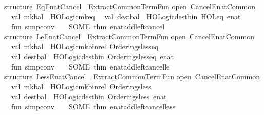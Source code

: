\begin{isabellebody}
\isanewline
structure\ Eq{\isacharunderscore}Enat{\isacharunderscore}Cancel\ {\isacharequal}\ ExtractCommonTermFun\isanewline
{\isacharparenleft}open\ Cancel{\isacharunderscore}Enat{\isacharunderscore}Common\isanewline
\ \ val\ mk{\isacharunderscore}bal\ {\isacharequal}\ HOLogic{\isachardot}mk{\isacharunderscore}eq\isanewline
\ \ val\ dest{\isacharunderscore}bal\ {\isacharequal}\ HOLogic{\isachardot}dest{\isacharunderscore}bin\ \isactrlconstUNDERSCOREname {\isasymopen}HOL{\isachardot}eq{\isasymclose}\ \isactrltyp {\isasymopen}enat{\isasymclose}\isanewline
\ \ fun\ simp{\isacharunderscore}conv\ {\isacharunderscore}\ {\isacharunderscore}\ {\isacharequal}\ SOME\ {\isacharat}{\isacharbraceleft}thm\ enat{\isacharunderscore}add{\isacharunderscore}left{\isacharunderscore}cancel{\isacharbraceright}\isanewline
{\isacharparenright}\isanewline
\isanewline
structure\ Le{\isacharunderscore}Enat{\isacharunderscore}Cancel\ {\isacharequal}\ ExtractCommonTermFun\isanewline
{\isacharparenleft}open\ Cancel{\isacharunderscore}Enat{\isacharunderscore}Common\isanewline
\ \ val\ mk{\isacharunderscore}bal\ {\isacharequal}\ HOLogic{\isachardot}mk{\isacharunderscore}binrel\ \isactrlconstUNDERSCOREname {\isasymopen}Orderings{\isachardot}less{\isacharunderscore}eq{\isasymclose}\isanewline
\ \ val\ dest{\isacharunderscore}bal\ {\isacharequal}\ HOLogic{\isachardot}dest{\isacharunderscore}bin\ \isactrlconstUNDERSCOREname {\isasymopen}Orderings{\isachardot}less{\isacharunderscore}eq{\isasymclose}\ \isactrltyp {\isasymopen}enat{\isasymclose}\isanewline
\ \ fun\ simp{\isacharunderscore}conv\ {\isacharunderscore}\ {\isacharunderscore}\ {\isacharequal}\ SOME\ {\isacharat}{\isacharbraceleft}thm\ enat{\isacharunderscore}add{\isacharunderscore}left{\isacharunderscore}cancel{\isacharunderscore}le{\isacharbraceright}\isanewline
{\isacharparenright}\isanewline
\isanewline
structure\ Less{\isacharunderscore}Enat{\isacharunderscore}Cancel\ {\isacharequal}\ ExtractCommonTermFun\isanewline
{\isacharparenleft}open\ Cancel{\isacharunderscore}Enat{\isacharunderscore}Common\isanewline
\ \ val\ mk{\isacharunderscore}bal\ {\isacharequal}\ HOLogic{\isachardot}mk{\isacharunderscore}binrel\ \isactrlconstUNDERSCOREname {\isasymopen}Orderings{\isachardot}less{\isasymclose}\isanewline
\ \ val\ dest{\isacharunderscore}bal\ {\isacharequal}\ HOLogic{\isachardot}dest{\isacharunderscore}bin\ \isactrlconstUNDERSCOREname {\isasymopen}Orderings{\isachardot}less{\isasymclose}\ \isactrltyp {\isasymopen}enat{\isasymclose}\isanewline
\ \ fun\ simp{\isacharunderscore}conv\ {\isacharunderscore}\ {\isacharunderscore}\ {\isacharequal}\ SOME\ {\isacharat}{\isacharbraceleft}thm\ enat{\isacharunderscore}add{\isacharunderscore}left{\isacharunderscore}cancel{\isacharunderscore}less{\isacharbraceright}\isanewline

\end{isabellebody}
